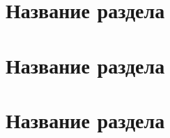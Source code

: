 \section{Название раздела}



\section[Краткое название раздела]{%
  Название раздела}



\section[Краткое название раздела]{%
  Название раздела}


